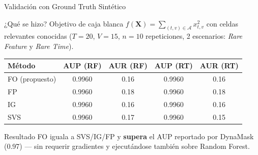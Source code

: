 \documentclass{beamer}
\begin{document}
\begin{frame}{Validación con Ground Truth Sintético}
    \begin{block}{¿Qué se hizo?}
        Objetivo de caja blanca $f(\mathbf{X}) = \sum_{(t,v)\in
        \mathcal{A}} x_{t,v}^2$ con celdas relevantes conocidas
        ($T{=}20$, $V{=}15$, $n{=}10$ repeticiones, 2 escenarios:
        \textit{Rare Feature} y \textit{Rare Time}).
    \end{block}
    \vspace{0.1cm}
    \centering
    \scriptsize
    \begin{tabular}{lcccc}
        \toprule
        \textbf{Método} & \textbf{AUP (RF)} & \textbf{AUR (RF)}
        & \textbf{AUP (RT)} & \textbf{AUR (RT)}\\
        \midrule
        FO (propuesto) & 0.9960 & 0.16 & 0.9960 & 0.16 \\
        FP             & 0.9960 & 0.18 & 0.9960 & 0.18 \\
        IG             & 0.9960 & 0.16 & 0.9960 & 0.16 \\
        SVS            & 0.9960 & 0.17 & 0.9960 & 0.15 \\
        \bottomrule
    \end{tabular}
    \vspace{0.2cm}
    \begin{alertblock}{Resultado}
        FO iguala a SVS/IG/FP y \textbf{supera} el AUP reportado por
        DynaMask (0.97) — sin requerir gradientes y ejecutándose
        también sobre Random Forest.
    \end{alertblock}
\end{frame}
\end{document}
